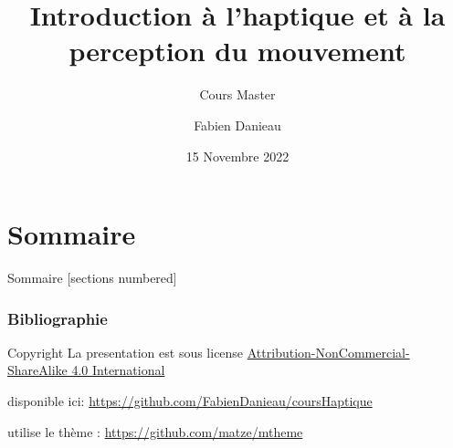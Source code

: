 \documentclass[compress, noflama]{beamer}
\title{Introduction à l'haptique et à la perception du mouvement}
\subtitle{Cours Master}
\date{15 Novembre 2022}%
\author{Fabien Danieau}
\institute{Pollen Robotics\\ \href{mailto:fabien.danieau@interdigital.com}{fabien.danieau@pollen-robotics.com}}
\begin{document}

\maketitle


\section*{Sommaire}
\begin{frame}{Sommaire}
	[sections numbered]
	\tableofcontents[hideallsubsections]
\end{frame}









 

 
\appendix 
 


\begin{frame}[allowframebreaks]
\frametitle{Bibliographie}
  

\end{frame}

\begin{frame}{Copyright}
La presentation est sous license \href{https://creativecommons.org/licenses/by-nc-sa/4.0/}{Attribution-NonCommercial-ShareAlike 4.0 International}

\begin{center}\ccbyncsa\end{center}
disponible ici: \url{https://github.com/FabienDanieau/coursHaptique}

utilise le thème : \url{https://github.com/matze/mtheme}


\end{frame}
\end{document}
